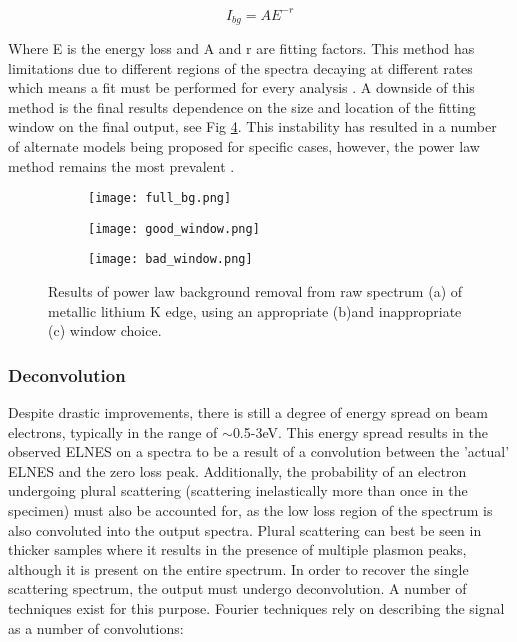 \begin{equation}
	I_{bg} = AE^{-r}
\end{equation}

Where E is the energy loss and A and r are fitting factors.  This method has limitations due to different regions of the spectra decaying at different rates which means a fit must be performed for every analysis \cite{verbeeck_model_2004, egerton_inelastic_1975}.  A downside of this method is the final results dependence on the size and location of the fitting window on the final output, see Fig \ref{bg_removal}.  This instability has resulted in a number of alternate models being proposed for specific cases, however, the power law method remains the most prevalent \cite{verbeeck_model_2004, riedl_extraction_2006}.  

\begin{figure}
	\centering
	\begin{subfigure}{0.45\textwidth}
		\texttt{[image: full\_bg.png]} 
		\caption{}
		\label{full_bg}
	\end{subfigure}
	\hfill
	
	\begin{subfigure}{0.45\textwidth}
		\texttt{[image: good\_window.png]} 
		\caption{}
		\label{good_window}
	\end{subfigure}
	\begin{subfigure}{0.45\textwidth}
		\texttt{[image: bad\_window.png]} 
		\caption{}
		\label{bad_window}
	\end{subfigure}
	\caption{Results of power law background removal from raw spectrum (a) of metallic lithium K edge, using an appropriate (b)and inappropriate (c) window choice.}
	\label{bg_removal}
\end{figure}

\subsubsection{Deconvolution}
Despite drastic improvements, there is still a degree of energy spread on beam electrons, typically in the range of $\sim$0.5-3eV.  This energy spread results in the observed ELNES on a spectra to be a result of a convolution between the 'actual' ELNES and the zero loss peak.  Additionally, the probability of an electron undergoing plural scattering (scattering inelastically more than once in the specimen) must also be accounted for, as the low loss region of the spectrum is also convoluted into the output spectra.  Plural scattering can best be seen in thicker samples where it results in the presence of multiple plasmon peaks, although it is present on the entire spectrum.  In order to recover the single scattering spectrum, the output must undergo deconvolution.  A number of techniques exist for this purpose.   Fourier techniques rely on describing the signal as a number of convolutions:

